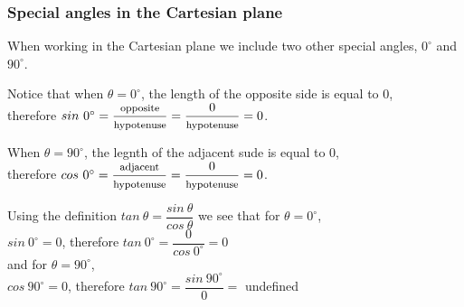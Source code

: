 \subsubsection{Special angles in the Cartesian plane}
When working in the Cartesian plane we include two other special angles, $0^{\circ}$ and $90^{\circ}$. \par

Notice that when $\theta = 0^{\circ}$, the length of the opposite side is equal to $0$, \\[5pt]
therefore $sin~0^{\circ} = \dfrac{\mbox{\footnotesize opposite}}{\mbox{\footnotesize hypotenuse}} = \dfrac{0}{\mbox{\footnotesize hypotenuse}} =0$.\par

When $\theta = 90^{\circ}$, the legnth of the adjacent sude is equal to $0$, \\[5pt]
therefore $cos~0^{\circ} = \dfrac{\mbox{\footnotesize adjacent}}{\mbox{\footnotesize hypotenuse}} = \dfrac{0}{\mbox{\footnotesize hypotenuse}} =0$.\par

Using the definition $tan~\theta=\dfrac{sin~\theta}{cos~\theta}$ we see that for $\theta =  0^{\circ}$,\\[5pt]
$sin~0^{\circ}=0$, therefore $tan~0^{\circ}=\dfrac{0}{cos~0^{\circ}} = 0$\\[5pt]
and for $\theta =  90^{\circ}$, \\
$cos~90^{\circ}=0$, therefore $tan~90^{\circ}=\dfrac{sin~90^{\circ}}{0} =$ undefined\\

